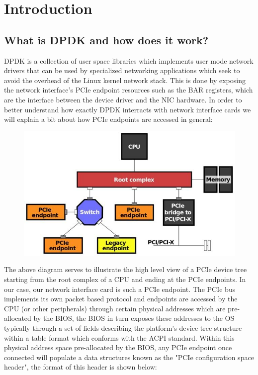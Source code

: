\documentclass[a4paper,12p]{article}
\begin{document}
\section{Introduction}
\subsection{What is DPDK and how does it work?}
DPDK is a collection of user space libraries which implements user mode network drivers that can be used by specialized networking applications which seek to avoid the overhead of the Linux kernel network stack. This is done by exposing the network interface’s PCIe endpoint resources such as the BAR registers, which are the interface between the device driver and the NIC hardware. In order to better understand how exactly DPDK interracts with network interface cards we will explain a bit about how PCIe endpoints are accessed in general:

\begin{figure}[h]
\centering
\includegraphics[width=\textwidth]{pcie}
\end{figure}

The above diagram serves to illustrate the high level view of a PCIe device tree starting from the root complex of a CPU and ending at the PCIe endpoints. In our case, our network interface card is such a PCIe endpoint. The PCIe bus implements its own packet based protocol and endpoints are accessed by the CPU (or other peripherals) through certain physical addresses which are pre-allocated by the BIOS, the BIOS in turn exposes these addresses to the OS typically through a set of fields describing the platform’s device tree structure within a table format which conforms with the ACPI standard.
Within this physical address space pre-allocated by the BIOS, any PCIe endpoint once connected will populate a data structures known as the "PCIe configuration space header", the format of this header is shown below:
\end{document}
